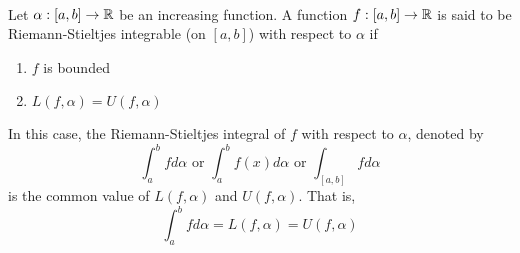 \begin{definition}  \leavevmode\\
    Let $\alpha : [a,b] \to \mathbb{R}$ be an increasing function. A function $f: [a,b] \to \mathbb{R}$ is said to be Riemann-Stieltjes integrable (on $[a,b]$) with respect to $\alpha$ if 
    \begin{enumerate}[$(i)$]
        \item $f$ is bounded
        \item $L(f, \alpha) = U(f, \alpha)$
    \end{enumerate}
    In this case, the Riemann-Stieltjes integral of $f$ with respect to $\alpha$, denoted by
    $$
    \text{$\int_{a}^{b}f d\alpha$ or $\int_{a}^{b}f(x) d\alpha$ or $\int_{[a,b]}fd\alpha$}
    $$
    is the common value of $L(f, \alpha)$ and $U(f, \alpha)$. That is,
    $$
    \int_{a}^{b}f d\alpha = L(f, \alpha) = U(f, \alpha)
    $$
\end{definition}

